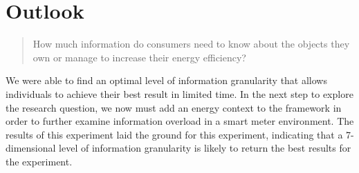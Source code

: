\section{Outlook}
\begin{quote}
How much information do consumers need to know about the objects they own or manage to increase their energy efficiency?
\end{quote}
We were able to find an optimal level of information granularity that allows individuals to achieve their best result in limited time. In the next step to explore the research question, we now must add an energy context to the framework in order to further examine information overload in a smart meter environment. The results of this experiment laid the ground for this experiment, indicating that a 7-dimensional level of information granularity is likely to return the best results for the experiment.

%
%
%
%

%
%
